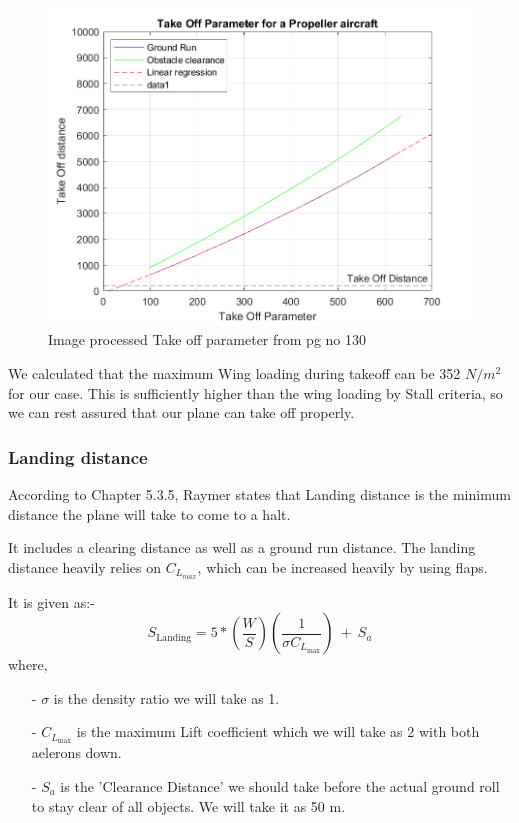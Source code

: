 \documentclass[12 pt]{article}
\begin{document}
\begin{figure}[h]
    \centering
    \includegraphics[width=0.8\linewidth]{Codes/week 4/Takeoffparam.png}
    \caption{Image processed Take off parameter from \protect\cite{Raymer2006} pg no 130}
    \label{Image processed Take off parameter}
\end{figure}


We calculated that the maximum Wing loading during takeoff can be 352 $N/m^2$ for our case. This is sufficiently higher than the wing loading by Stall criteria, so we can rest assured that our plane can take off properly.

\subsubsection{{Landing distance}}

According to \cite{Raymer2006} Chapter 5.3.5, Raymer states that Landing distance is the minimum distance the plane will take to come to a halt.

It includes a clearing distance as well as a ground run distance. The landing distance heavily relies on $C_{L_{max}}$, which can be increased heavily by using flaps.

It is given as:- 
$$ S_{\text{Landing}} = 5*\left( \frac{W}{S} \right) \left( \frac{1}{\sigma C_{L_{\text{max}}}} \right) \: + \: S_a$$
where,
\begin{itemize}
    \item [-] $\sigma$ is the density ratio we will take as 1.
    \item[-] $C_{L_{\text{max}}} $ is the maximum Lift coefficient which we will take as 2 with both aelerons down.
    \item[-] $S_a$ is the 'Clearance Distance' we should take before the actual ground roll to stay clear of all objects. We will take it as 50 m.
\end{itemize}
\end{document}
